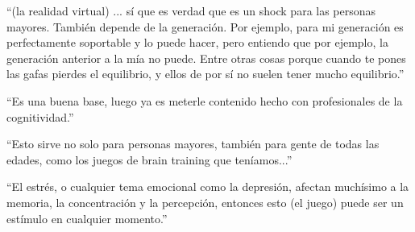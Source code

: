 ``(la realidad virtual) ... sí que es verdad que es un shock para las personas mayores. También depende de la generación. Por ejemplo, para mi generación es perfectamente soportable y lo puede hacer, pero entiendo que por ejemplo, la generación anterior a la mía no puede. Entre otras cosas porque cuando te pones las gafas pierdes el equilibrio, y ellos de por sí no suelen tener mucho equilibrio.''

``Es una buena base, luego ya es meterle contenido hecho con profesionales de la cognitividad.''

``Esto sirve no solo para personas mayores, también para gente de todas las edades, como los juegos de brain training que teníamos...''

``El estrés, o cualquier tema emocional como la depresión, afectan muchísimo a la memoria, la concentración y la percepción, entonces esto (el juego) puede ser un estímulo en cualquier momento.''











